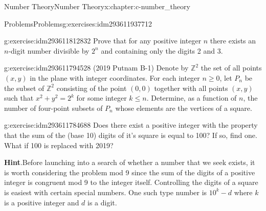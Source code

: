 \documentclass[twoside,10pt,]{book}
\newcommand{\blocktitlefont}{\relax}
\numberwithin{equation}{section}
\begin{document}
\begin{chapterptx}{Number Theory}{}{Number Theory}{}{}{x:chapter:c-number_theory}
\begin{exercises-section}{Problems}{}{Problems}{}{}{g:exercises:idm293611937712}
\begin{divisionexercise}{14}{}{}{g:exercise:idm293611812832}
Prove that for any positive integer \(n\) there exists an \(n\)-digit number divisible by \(2^n\) and containing only the digits 2 and 3.%
\end{divisionexercise}%
\begin{divisionexercise}{15}{}{}{g:exercise:idm293611794528}%
(2019 Putnam B-1) Denote by \(\mathbb{Z}^2\) the set of all points \((x,y)\) in the plane with integer coordinates. For each integer \(n \geq 0\), let \(P_n\) be the subset of \(\mathbb{Z}^2\) consisting of the point \((0,0)\) together with all points \((x,y)\) such that \(x^2 + y^2 = 2^k\) for some integer \(k \leq n\). Determine, as a function of \(n\), the number of four-point subsets of \(P_n\) whose elements are the vertices of a square.%
\end{divisionexercise}%
\begin{divisionexercise}{16}{}{}{g:exercise:idm293611784688}%
Does there exist a positive integer with the property that the sum of the (base 10) digits of it’s square is equal to 100?  If so, find one. What if 100 is replaced with 2019?%
\par\smallskip%
\noindent\textbf{\blocktitlefont Hint}.\label{g:hint:idm293611779248}{}\hypertarget{g:hint:idm293611779248}{}\quad{}Before launching into a search of whether a number that we seek exists, it is worth considering the problem mod 9 since the sum of the digits of a positive integer is congruent mod 9 to the integer itself.   Controlling the digits of a square is easiest with certain special numbers.   One such type number is \(10^k-d\) where \(k\) is a positive integer and \(d\) is a digit.%
\end{divisionexercise}%
\end{exercises-section}
\end{chapterptx}
%
%
\typeout{************************************************}
\typeout{************************************************}
%
\end{document}
